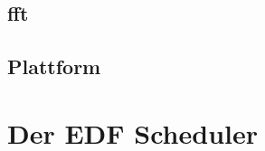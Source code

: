 \documentclass{scrartcl}
\begin{document}
		\subsection{\ac{fft}} \label{section:fft}
			
		\subsection{Plattform} \label{section:plattform}
			
	\clearpage
	\section{Der EDF Scheduler} \label{section:der_edf_scheduler}
		
		\clearpage
	\listoffigures
		\clearpage
	\listoftables
	\clearpage
		\printbibliography{}
		\clearpage
\end{document}
